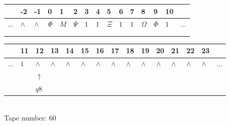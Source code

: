 \documentclass[11pt]{article}
\begin{document}
\begin{table}[H]
\centering
\begin{tabular}{lllllllllllllll}
 & -2 & -1 & 0 & 1 & 2 & 3 & 4 & 5 & 6 & 7 & 8 & 9 & 10 & \\
\hline
$...$ & \multicolumn{1}{|l|}{$\wedge$} & \multicolumn{1}{|l|}{$\wedge$} & \multicolumn{1}{|l|}{$\Phi$} & \multicolumn{1}{|l|}{$M$} & \multicolumn{1}{|l|}{$\Psi$} & \multicolumn{1}{|l|}{$1$} & \multicolumn{1}{|l|}{$1$} & \multicolumn{1}{|l|}{$\Xi$} & \multicolumn{1}{|l|}{$1$} & \multicolumn{1}{|l|}{$1$} & \multicolumn{1}{|l|}{$\Omega$} & \multicolumn{1}{|l|}{$\Phi$} & \multicolumn{1}{|l|}{$1$} & $...$\\
\hline
&  &  &  &  &  &  &  &  &  &  &  &  &  &  \\
&  &  &  &  &  &  &  &  &  &  &  &  &  &  \\
\end{tabular}
\begin{tabular}{lllllllllllllll}
 & 11 & 12 & 13 & 14 & 15 & 16 & 17 & 18 & 19 & 20 & 21 & 22 & 23 & \\
\hline
$...$ & \multicolumn{1}{|l|}{$1$} & \multicolumn{1}{|l|}{$\wedge$} & \multicolumn{1}{|l|}{$\wedge$} & \multicolumn{1}{|l|}{$\wedge$} & \multicolumn{1}{|l|}{$\wedge$} & \multicolumn{1}{|l|}{$\wedge$} & \multicolumn{1}{|l|}{$\wedge$} & \multicolumn{1}{|l|}{$\wedge$} & \multicolumn{1}{|l|}{$\wedge$} & \multicolumn{1}{|l|}{$\wedge$} & \multicolumn{1}{|l|}{$\wedge$} & \multicolumn{1}{|l|}{$\wedge$} & \multicolumn{1}{|l|}{$\wedge$} & $...$\\
\hline
&  & $\uparrow$ &  &  &  &  &  &  &  &  &  &  &  &  \\
&  & $ q8 $ &  &  &  &  &  &  &  &  &  &  &  &  \\
\end{tabular}
\\
Tape number: 60
\noindent\makebox[\linewidth]{\hdashrule{\textwidth}{1pt}{1pt}}\end{table}
\end{document}
